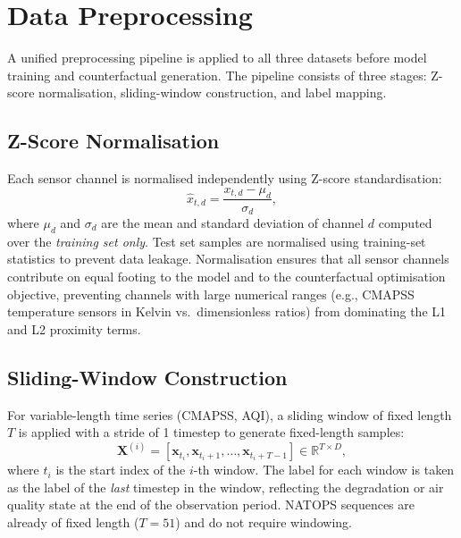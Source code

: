 \section{Data Preprocessing}

A unified preprocessing pipeline is applied to all three datasets before model training and counterfactual generation. The pipeline consists of three stages: Z-score normalisation, sliding-window construction, and label mapping.

\subsection{Z-Score Normalisation}

Each sensor channel is normalised independently using Z-score standardisation:
\begin{equation}
    \hat{x}_{t,d} = \frac{x_{t,d} - \mu_d}{\sigma_d},
\end{equation}
where $\mu_d$ and $\sigma_d$ are the mean and standard deviation of channel $d$ computed over the \emph{training set only}. Test set samples are normalised using training-set statistics to prevent data leakage. Normalisation ensures that all sensor channels contribute on equal footing to the model and to the counterfactual optimisation objective, preventing channels with large numerical ranges (e.g., CMAPSS temperature sensors in Kelvin vs.\ dimensionless ratios) from dominating the L1 and L2 proximity terms.

\subsection{Sliding-Window Construction}

For variable-length time series (CMAPSS, AQI), a sliding window of fixed length $T$ is applied with a stride of 1 timestep to generate fixed-length samples:
\begin{equation}
    \mathbf{X}^{(i)} = \left[\mathbf{x}_{t_i}, \mathbf{x}_{t_i+1}, \ldots, \mathbf{x}_{t_i + T - 1}\right] \in \mathbb{R}^{T \times D},
\end{equation}
where $t_i$ is the start index of the $i$-th window. The label for each window is taken as the label of the \emph{last} timestep in the window, reflecting the degradation or air quality state at the end of the observation period. NATOPS sequences are already of fixed length ($T = 51$) and do not require windowing.

